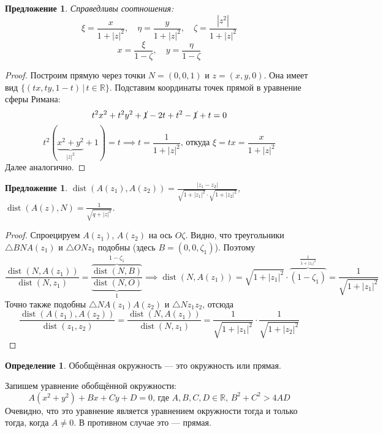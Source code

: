 \documentclass[11pt,openany,a4paper]{scrartcl}
\theoremstyle{plain}
\newtheorem{proposition}[theorem]{Предложение}
\theoremstyle{definition}
\newtheorem{definition}[theorem]{Определение}
\newcommand\mb{\mathbb}
\newcommand\real{\mb R}
\DeclareMathOperator{\dist}{dist}
\begin{document}
\begin{proposition}
	Справедливы соотношения:
	$$
	\xi = \frac{x}{1 + |z|^2},\quad\eta = \frac{y}{1 + |z|^2},\quad\zeta = \frac{|z^2|}{1 + |z|^2}
	$$
	$$
	x = \frac{\xi}{1 - \zeta},\quad y = \frac{\eta}{1 - \zeta}
	$$
\end{proposition}
\begin{proof}
	Построим прямую через точки $N = (0, 0, 1)$ и $z = (x, y, 0)$. Она имеет вид
	$\{(tx, ty, 1-t)\,|\, t \in \real\}$. Подставим координаты точек прямой в уравнение сферы Римана:
	$$
	t^2x^2 + t^2y^2 + \cancel{1} - 2t + t^2 - \cancel{1} + t = 0
	$$
	$$
	t^2(\underbrace{x^2 + y^2}_{|z|^2} + 1) = t \implies t = \frac{1}{1 + |z|^2} \text{, откуда } \xi = tx =
	\frac{x}{1 + |z|^2}
	$$
	Далее аналогично.
\end{proof}
\begin{proposition}
	$\dist(A(z_1), A(z_2)) = \frac{|z_1 - z_2|}{\sqrt{1 + |z_1|^2} \cdot \sqrt{1 + |z_2|^2}}$,
	$\dist(A(z), N) = \frac{1}{\sqrt{q + |z|^2}}$.
\end{proposition}
\begin{proof}
	Спроецируем $A(z_1)$, $A(z_2)$ на ось $O\zeta$. Видно, что треугольники $\triangle BNA(z_1)$ и $\triangle ONz_1$
	подобны (здесь $B = (0, 0, \zeta_1)$). Поэтому
	$$
	\frac{\dist(N, A(z_1))}{\dist(N, z_1)} = \frac{\overbrace{\dist(N, B)}^{1 - \zeta_1}}{\underbrace{\dist(N, O)}_1}
	\implies \dist(N, A(z_1)) = \sqrt{1 + |z_1|^2} \cdot \overbrace{(1 - \zeta_1)}^{\frac{1}{1 + |z_1|^2}} = 
	\frac{1}{\sqrt{1 + |z_1|^2}}
	$$
	Точно также подобны $\triangle NA(z_1)A(z_2)$ и $\triangle Nz_1z_2$, отсюда
	$$
	\frac{\dist(A(z_1), A(z_2))}{\dist(z_1, z_2)} = \frac{\dist(N, A(z_1))}{\dist(N, z_1)} = \frac{1}{\sqrt{1 +|z_1|^2}}
	\cdot \frac{1}{\sqrt{1 + |z_2|^2}}
	$$
\end{proof}

\begin{definition}
	Обобщённая окружность — это окружность или прямая.
\end{definition}

Запишем уравнение обобщённой окружности:
$$
A(x^2 + y^2) + Bx + Cy + D = 0 \text{, где } A, B, C, D \in \real,\, B^2 + C^2 > 4AD
$$
Очевидно, что это уравнение является уравнением окружности тогда и только тогда, когда $A \neq 0$. В противном случае это — 
прямая.
\end{document}

